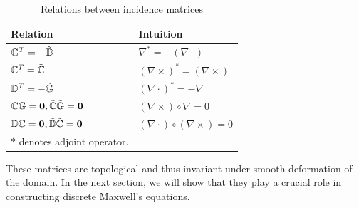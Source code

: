 \documentclass{article}
\begin{document}
\begin{table}[h!]
    \centering
    \begin{tabular}{l l}
    \hline
         Relation & Intuition \\
    \hline
         $\mathbb{G}^T = -\Tilde{\mathbb{D}}$  &  $\nabla ^* = - (\nabla \cdot) $\\
         $\mathbb{C}^T = \Tilde{\mathbb{C}}$   &  $(\nabla \times) ^* = (\nabla \times) $\\
         $\mathbb{D}^T = -\Tilde{\mathbb{G}}$  &  $(\nabla \cdot) ^* = - \nabla $\\
         $\mathbb{C}\mathbb{G} = \mathbf{0}, \Tilde{\mathbb{C}}\Tilde{\mathbb{G}} = \mathbf{0}$  &  $(\nabla \times)\circ \nabla = 0$ \\
         $\mathbb{D}\mathbb{C} = \mathbf{0}, \Tilde{\mathbb{D}}\Tilde{\mathbb{C}} = \mathbf{0}$   &  $(\nabla \cdot) \circ ( \nabla \times) = 0$ \\
    \hline
        \small $\ast$ denotes adjoint operator.
    \end{tabular}
    \caption{Relations between incidence matrices}
    \label{tab:incidence_relation}
\end{table}

These matrices are topological and thus invariant under smooth deformation of the domain. In the next section, we will show that they play a crucial role in constructing discrete Maxwell's equations. 
\end{document}
